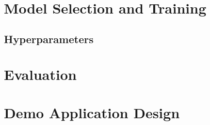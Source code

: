 \section{Model Selection and Training}
\subsection{Hyperparameters}

\section{Evaluation}

\section{Demo Application Design}
